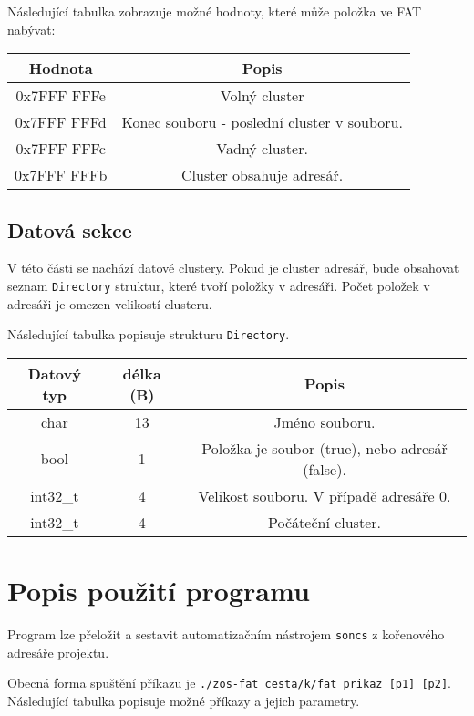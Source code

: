\documentclass[11pt,a4paper]{scrartcl}
\begin{document}
	Následující tabulka zobrazuje možné hodnoty, které může položka ve FAT nabývat:
	
	\begin{center}
		\begin{tabular}{|c|c|}
			\hline
			Hodnota & Popis \\
			\hline
			0x7FFF FFFe & Volný cluster \\
			0x7FFF FFFd & Konec souboru - poslední cluster v souboru. \\
			0x7FFF FFFc & Vadný cluster. \\
			0x7FFF FFFb & Cluster obsahuje adresář. \\
			\hline
		\end{tabular}
	\end{center}
	
	\subsection{Datová sekce}
	V této části se nachází datové clustery. Pokud je cluster adresář, bude obsahovat seznam \verb|Directory| struktur, které tvoří položky v adresáři. Počet položek v adresáři je omezen velikostí clusteru.
	
	Následující tabulka popisuje strukturu \verb|Directory|.
	
	\begin{center}
		\begin{tabular}{|c|c|c|}
			\hline
			Datový typ & délka (B) & Popis \\
			\hline
			char & 13 & Jméno souboru. \\
			bool & 1 & Položka je soubor (true), nebo adresář (false). \\
			int32\_t & 4 & Velikost souboru. V případě adresáře 0. \\
			int32\_t & 4 & Počáteční cluster. \\
			\hline
		\end{tabular}
	\end{center}

	\section{Popis použití programu}
	Program lze přeložit a sestavit automatizačním nástrojem \verb|soncs| z kořenového adresáře projektu.
	
	Obecná forma spuštění příkazu je \verb|./zos-fat cesta/k/fat prikaz [p1] [p2]|.
	Následující tabulka popisuje možné příkazy a jejich parametry.
	
\end{document}
